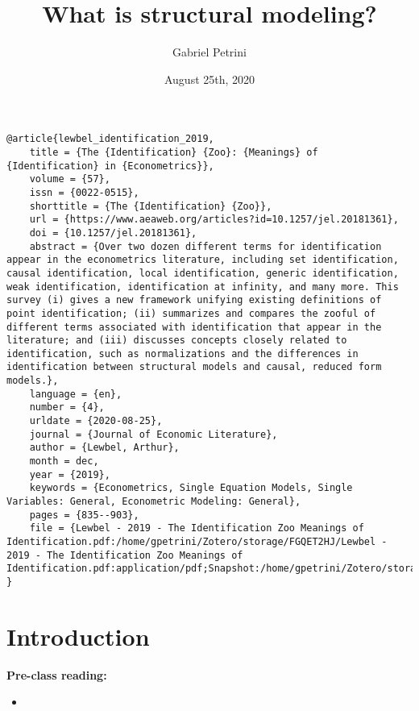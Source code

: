 \documentclass[11pt]{article}
\author{Gabriel Petrini}
\date{August 25th, 2020}
\title{What is structural modeling?}
\begin{document}
\maketitle
\tableofcontents

\begin{verbatim}
@article{lewbel_identification_2019,
	title = {The {Identification} {Zoo}: {Meanings} of {Identification} in {Econometrics}},
	volume = {57},
	issn = {0022-0515},
	shorttitle = {The {Identification} {Zoo}},
	url = {https://www.aeaweb.org/articles?id=10.1257/jel.20181361},
	doi = {10.1257/jel.20181361},
	abstract = {Over two dozen different terms for identification appear in the econometrics literature, including set identification, causal identification, local identification, generic identification, weak identification, identification at infinity, and many more. This survey (i) gives a new framework unifying existing definitions of point identification; (ii) summarizes and compares the zooful of different terms associated with identification that appear in the literature; and (iii) discusses concepts closely related to identification, such as normalizations and the differences in identification between structural models and causal, reduced form models.},
	language = {en},
	number = {4},
	urldate = {2020-08-25},
	journal = {Journal of Economic Literature},
	author = {Lewbel, Arthur},
	month = dec,
	year = {2019},
	keywords = {Econometrics, Single Equation Models, Single Variables: General, Econometric Modeling: General},
	pages = {835--903},
	file = {Lewbel - 2019 - The Identification Zoo Meanings of Identification.pdf:/home/gpetrini/Zotero/storage/FGQET2HJ/Lewbel - 2019 - The Identification Zoo Meanings of Identification.pdf:application/pdf;Snapshot:/home/gpetrini/Zotero/storage/9SLKLEAT/articles.html:text/html}
}
\end{verbatim}

\section{Introduction}
\label{sec:orgfe1a745}


\textbf{Pre-class reading:} 

\begin{itemize}
\item {}
\end{itemize}
\end{document}
